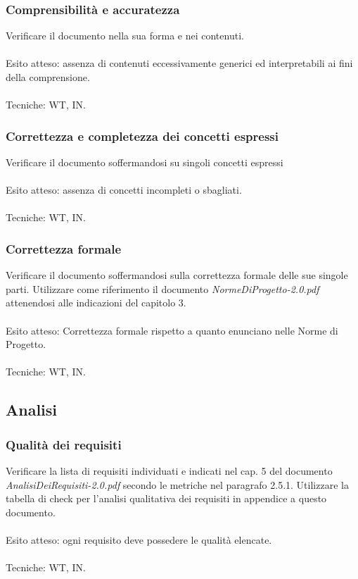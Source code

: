 \subsubsection{Comprensibilit\`a e accuratezza}

Verificare il documento nella sua forma e nei contenuti.
\\\\
Esito atteso: assenza di contenuti eccessivamente generici ed interpretabili ai
fini della comprensione.
\\\\
Tecniche: WT, IN.

\subsubsection{Correttezza e completezza dei concetti espressi}

Verificare il documento soffermandosi su singoli concetti espressi
\\\\
Esito atteso: assenza di concetti incompleti o sbagliati.
\\\\
Tecniche: WT, IN.

\subsubsection{Correttezza formale}

Verificare il documento soffermandosi sulla correttezza formale delle sue 
singole parti. Utilizzare come riferimento il documento
\emph{NormeDiProgetto-2.0.pdf} attenendosi alle indicazioni del capitolo 3.
\\\\
Esito atteso: Correttezza formale rispetto a quanto enunciano nelle Norme di
Progetto.
\\\\
Tecniche: WT, IN.


\subsection{Analisi}

\subsubsection{Qualit\`a dei requisiti}

Verificare la lista di requisiti individuati e indicati nel cap. 5 del documento
\emph{AnalisiDeiRequisiti-2.0.pdf} secondo le metriche nel paragrafo 2.5.1.
Utilizzare la tabella di check per l'analisi qualitativa dei requisiti in
appendice a questo documento.
\\\\
Esito atteso: ogni requisito deve possedere le qualit\`a elencate.
\\\\
Tecniche: WT, IN.


